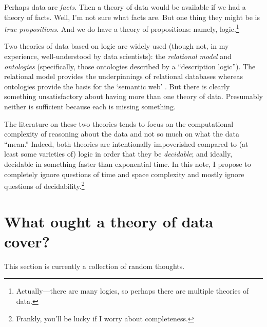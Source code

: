 \documentclass[10pt, a4paper, twocolumn]{article}
\begin{document}
Perhaps data are \emph{facts}. Then a theory of data would be available if we
had a theory of facts. Well, I'm not sure what facts are. But one thing they
might be is \emph{true propositions}. And we do have a theory of propositions:
namely, logic.\footnote{Actually---there are many logics, so perhaps there are
multiple theories of data.}

Two theories of data based on logic are widely used (though not, in my
experience, well-understood by data scientists): the \emph{relational model} and
\emph{ontologies} (specifically, those ontologies described by a ``description
logic''). The relational model provides the underpinnings of relational
databases \parencite{codd1970relational} whereas ontologies provide the basis
for the `semantic web' \parencite{DBLP:journals/corr/abs-1201-4089}. But there
is clearly something unsatisfactory about having more than one theory of data.
Presumably neither is sufficient because each is missing something.

The literature on these two theories tends to focus on the computational
complexity of reasoning about the data and not so much on what the data
``mean.''  Indeed, both theories are intentionally impoverished compared to (at
least some varieties of) logic in order that they be \emph{decidable}; and
ideally, decidable in something faster than exponential time. In this note, I
propose to completely ignore questions of time and space complexity and mostly
ignore questions of decidability.\footnote{Frankly, you'll be lucky if I worry
about completeness.}

\section{What ought a theory of data cover?}

This section is currently a collection of random thoughts. 
\end{document}
